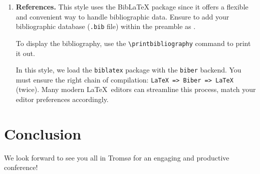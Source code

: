 \documentclass[fullpaper]{nldl}
\begin{document}
\begin{enumerate}[leftmargin=*]
\item \textbf{References.}
This style uses the BibLaTeX package since it offers a flexible and convenient way to handle bibliographic data.
Ensure to add your bibliographic database (\verb|.bib| file) within the preamble as \verb||.

To display the bibliography, use the \verb|\printbibliography| command to print it out.

In this style, we load the \verb|biblatex| package with the \verb|biber| backend.
You must ensure the right chain of compilation: \verb|LaTeX => Biber => LaTeX| (twice).
Many modern \LaTeX\ editors can streamline this process, match your editor preferences accordingly.

\end{enumerate}

\section{Conclusion}
We look forward to see you all in Troms{\o} for an engaging and productive conference!


\printbibliography
\end{document}
